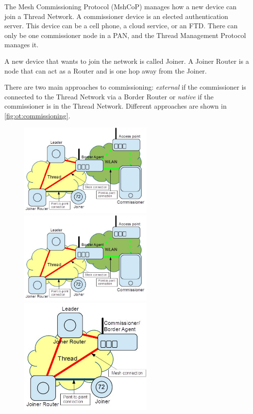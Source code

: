 The Mesh Commissioning Protocol (MshCoP) manages how a new device can join a Thread Network.
A commissioner device is an elected authentication server.
This device can be a cell phone, a cloud service, or an FTD.
There can only be one commissioner node in a PAN, and the Thread Management Protocol manages it.

A new device that wants to join the network is called Joiner.
A Joiner Router is a node that can act as a Router and is one hop away from the Joiner.

There are two main approaches to commissioning:
\emph{external} if the commissioner is connected to the Thread Network via a Border Router or
\emph{native} if the commissioner is in the Thread Network.
Different approaches are shown in \autoref{fig:ot:commissioning}.

\begin{figure}[!ht]
    \centering
    \includegraphics[width=67mm, keepaspectratio]{figures/external1-Final_12639Thread_1.3.jpg}\hspace{1cm}
    \includegraphics[width=67mm, keepaspectratio]{figures/external1-Final_12639Thread_1.3.jpg}\\\vspace{5mm}
    \includegraphics[width=67mm, keepaspectratio]{figures/native1-Final_12639Thread_1.3.jpg}\hspace{1cm}

\end{figure}
